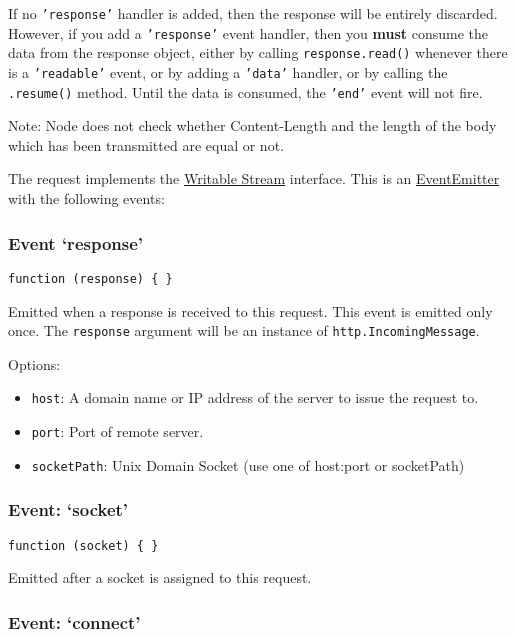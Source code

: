 If no \texttt{'response'} handler is added, then the response will be
entirely discarded. However, if you add a \texttt{'response'} event
handler, then you \textbf{must} consume the data from the response
object, either by calling \texttt{response.read()} whenever there is a
\texttt{'readable'} event, or by adding a \texttt{'data'} handler, or by
calling the \texttt{.resume()} method. Until the data is consumed, the
\texttt{'end'} event will not fire.

Note: Node does not check whether Content-Length and the length of the
body which has been transmitted are equal or not.

The request implements the
\href{stream.html\#stream\_writable\_stream}{Writable Stream} interface.
This is an
\href{events.html\#events\_class\_events\_eventemitter}{EventEmitter}
with the following events:

\subsubsection{Event `response'}

\texttt{function (response) \{ \}}

Emitted when a response is received to this request. This event is
emitted only once. The \texttt{response} argument will be an instance of
\texttt{http.IncomingMessage}.

Options:

\begin{itemize}
\item
  \texttt{host}: A domain name or IP address of the server to issue the
  request to.
\item
  \texttt{port}: Port of remote server.
\item
  \texttt{socketPath}: Unix Domain Socket (use one of host:port or
  socketPath)
\end{itemize}

\subsubsection{Event: `socket'}

\texttt{function (socket) \{ \}}

Emitted after a socket is assigned to this request.

\subsubsection{Event: `connect'}

